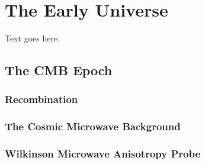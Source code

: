 
%
%

\section{The Early Universe}
\label{sec:early_universe}



Text goes here.




\subsection{The CMB Epoch}
\label{subsec:cmb_epoch}



\subsubsection{Recombination}
\label{subsubsec:recombination}



\subsubsection{The Cosmic Microwave Background}
\label{subsubsec:cmb}



\subsubsection{Wilkinson Microwave Anisotropy Probe}
\label{subsubsec:wmap}



